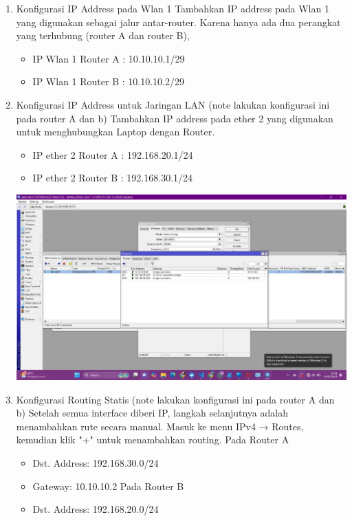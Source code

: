 \begin{enumerate}
\begin{enumerate}
\begin{itemize}
        \end{itemize}
        \item Konfigurasi IP Address pada Wlan 1 Tambahkan IP address pada Wlan 1 yang digunakan sebagai jalur antar-router. Karena hanya ada dua perangkat yang terhubung (router A dan router B),
        \begin{itemize}
            \item IP Wlan 1 Router A : 10.10.10.1/29
            \item IP Wlan 1 Router B : 10.10.10.2/29
        \end{itemize}
        \item Konfigurasi IP Address untuk Jaringan LAN (note lakukan konfigurasi ini pada router A dan b) Tambahkan IP address pada ether 2 yang digunakan untuk menghubungkan Laptop dengan Router.
        \begin{itemize}
            \item IP ether 2 Router A : 192.168.20.1/24
            \item IP ether 2 Router B : 192.168.30.1/24
        \end{itemize}
        \includegraphics[scale=0.4]{P1/img/7.jpg} \newline
        \item Konfigurasi Routing Statis (note lakukan konfigurasi ini pada router A dan b) Setelah semua interface diberi IP, langkah selanjutnya adalah menambahkan rute secara manual. Masuk ke menu IPv4 → Routes, kemudian klik "+" untuk menambahkan routing. Pada Router A
        \begin{itemize}
            \item Dst. Address: 192.168.30.0/24
            \item Gateway: 10.10.10.2 Pada Router B
            \item Dst. Address: 192.168.20.0/24

\end{itemize}
\end{enumerate}
\end{enumerate}
